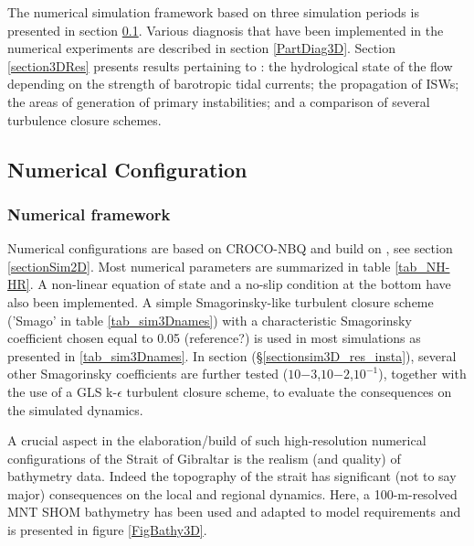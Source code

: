 The numerical simulation framework based on three simulation periods is presented in section \ref{section3Dnum}. Various diagnosis that have been implemented in the numerical experiments are described in section \ref{PartDiag3D}. Section \ref{section3DRes} presents results pertaining to : the hydrological state of the flow depending on the strength of barotropic tidal currents; the propagation of ISWs; the areas of generation of primary instabilities; and a comparison of several turbulence closure schemes.

\subsection{Numerical Configuration}
\label{section3Dnum}

\subsubsection{Numerical framework}

Numerical configurations are based on CROCO-NBQ and build on \citet{hilt_2020}, see section \ref{sectionSim2D}. Most numerical parameters are summarized in table \ref{tab_NH-HR}. A non-linear equation of state and a no-slip condition at the bottom have also been implemented. \color{blue} A simple Smagorinsky-like turbulent closure scheme ('Smago' in table \ref{tab_sim3Dnames}) with a characteristic Smagorinsky coefficient chosen equal to 0.05 (reference?) is used in most simulations as presented in \ref{tab_sim3Dnames}. In section (\S \ref{sectionsim3D_res_insta}), several other Smagorinsky coefficients are further tested  ($10{-3}$,$10{-2}$,$10^{-1}$), together with the use of a GLS k-$\epsilon$ turbulent closure scheme, to evaluate the consequences on the simulated dynamics.

A crucial aspect in the \color{red}elaboration/build\color{black} of such high-resolution numerical configurations of the Strait of Gibraltar is the realism (and quality) of \color{red}bathymetry\color{black} data. Indeed the topography of the strait has significant (not to say major) consequences on the local and regional dynamics. Here, a 100-m-resolved MNT SHOM bathymetry has been used and adapted to model requirements and is presented in figure \ref{FigBathy3D}.

